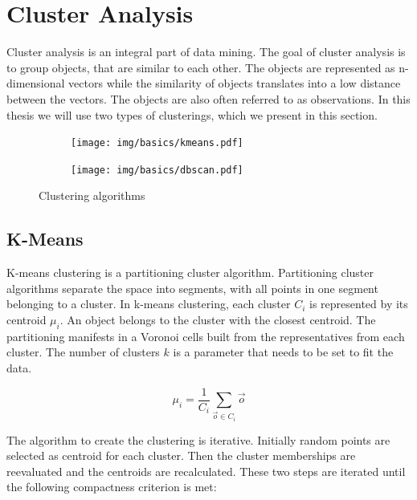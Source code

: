 \documentclass[pdftex,12pt,a4paper]{report}
\begin{document}
\section{Cluster Analysis}

Cluster analysis is an integral part of data mining. The goal of cluster analysis is to group objects, that are similar to each other. The objects are represented as n-dimensional vectors while the similarity of objects translates into a low distance between the vectors. The objects are also often referred to as observations. In this thesis we will use two types of clusterings, which we present in this section.

\begin{figure}[h]
	\centering
	\begin{subfigure}[b]{0.45\textwidth}
		\centering
		\texttt{[image: img/basics/kmeans.pdf]}
		\label{fig:basics-clustering-k-means}
	\end{subfigure}
	\begin{subfigure}[b]{0.45\textwidth}
		\centering
		\texttt{[image: img/basics/dbscan.pdf]}
		\label{fig:basics-clustering-dbscan}
	\end{subfigure}
	\caption{Clustering algorithms}
	\label{fig:basics-clustering}
\end{figure}

\subsection{K-Means}

K-means clustering is a partitioning cluster algorithm. Partitioning cluster algorithms separate the space into segments, with all points in one segment belonging to a cluster. In k-means clustering, each cluster $C_i$ is represented by its centroid $\mu_i$. An object belongs to the cluster with the closest centroid. The partitioning manifests in a Voronoi cells built from the representatives from each cluster. The number of clusters $k$ is a parameter that needs to be set to fit the data.

\begin{equation}
\mu_i = \frac{1}{C_i} \sum_{\vec{o} \in C_i}\vec{o}
\end{equation}

The algorithm to create the clustering is iterative. Initially random points are selected as centroid for each cluster. Then the cluster memberships are reevaluated and the centroids are recalculated. These two steps are iterated until the following compactness criterion is met:
\end{document}

